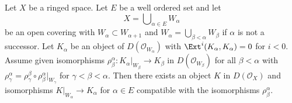 \begin{lemma}
\label{lemma-glueing-increasing-union}
Let $X$ be a ringed space. Let $E$ be a well ordered set and let
$$
X = \bigcup\nolimits_{\alpha \in E} W_\alpha
$$
be an open covering with $W_\alpha \subset W_{\alpha + 1}$
and $W_\alpha = \bigcup_{\beta < \alpha} W_\beta$ if $\alpha$ is not
a successor. Let $K_\alpha$ be an object of $D(\mathcal{O}_{W_\alpha})$
with $\Ext^i(K_\alpha, K_\alpha) = 0$ for $i < 0$.
Assume given isomorphisms
$\rho_\beta^\alpha :  K_\alpha|_{W_\beta} \to K_\beta$ in
$D(\mathcal{O}_{W_\beta})$ for all $\beta < \alpha$ with
$\rho_\gamma^\alpha = \rho_\gamma^\beta \circ \rho^\alpha_\beta|_{W_\gamma}$
for $\gamma < \beta < \alpha$.
Then there exists an object
$K$ in $D(\mathcal{O}_X)$ and isomorphisms
$K|_{W_\alpha} \to K_\alpha$ for $\alpha \in E$
compatible with the isomorphisms $\rho_\beta^\alpha$.
\end{lemma}

